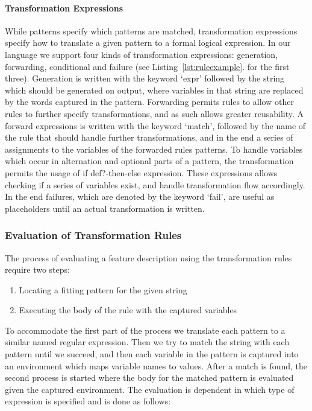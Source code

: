 \paragraph{Transformation Expressions}
\label{par:Transformation Expressions}
While patterns specify which patterns are matched, transformation expressions
specify how to translate a given pattern to a formal logical expression.
In our language we support four kinds of transformation expressions:
generation, forwarding, conditional and failure (see Listing~\ref{lst:ruleexample}. for the first three).
Generation is written with the keyword `expr'
followed by the string which should be generated on output, where variables
in that string are replaced by the words captured in the pattern.
Forwarding permits rules to allow other rules to further specify
transformations, and as such allows greater reusability.
A forward expressions is written with the keyword `match',
followed by the name of the rule that should handle further transformations,
and in the end a series of assignments to the variables of the forwarded
rules patterns.
To handle variables which occur in alternation and optional parts of a
pattern, the transformation permits the usage of if def?-then-else expression.
These expressions allows checking if a series of variables exist,
and handle transformation flow accordingly.
In the end failures, which are denoted by the keyword `fail',
are useful as placeholders until an actual transformation is written.

\subsubsection{Evaluation of Transformation Rules}
\label{sub:Evaluation of Transformation Rules}

The process of evaluating a feature description using the transformation rules require two steps:
\begin{enumerate}
  \item Locating a fitting pattern for the given string
  \item Executing the body of the rule with the captured variables
\end{enumerate}
To accommodate the first part of the process we translate each pattern to a
similar named regular expression.
Then we try to match the string with each pattern until we succeed,
and then each variable in the pattern is captured into an environment
which maps variable names to values.
After a match is found, the second process is started where the body
for the matched pattern is evaluated given the captured environment.
The evaluation is dependent in which type of expression is specified
and is done as follows:

